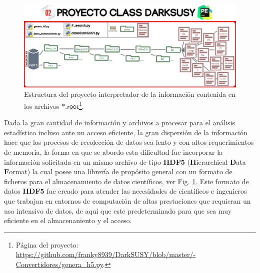 \begin{figure}[!h]
\centering
\includegraphics[width=1\textwidth]{Simulacion/imagenes/class_darksusy.png}
\caption[Estructura del proyecto interpretador de la información contenida en los archivos $\textsf{*.root}$.]{Estructura del proyecto interpretador de la información contenida en los archivos $\textsf{*.root}$\footnote{Página del proyecto: \href{https://github.com/franky8939/DarkSUSY/blob/master/00-Convertidores/genera_h5.py}{https://github.com/franky8939/\-Dark\-SUSY/\-blob/\-mas\-ter/-\-Con\-ver\-ti\-do\-res/\-ge\-ne\-ra\_h5.\-py}.}. }
\label{class_darksusy1}
\end{figure}
Dada la gran cantidad de información y archivos a procesar para el análisis estadístico incluso ante un acceso eficiente, la gran dispersión de la información hace que los procesos de recolección de datos sea lento y con altos requerimientos de memoria, la forma en que se abordo esta dificultad fue incorporar la información solicitada en un mismo archivo de tipo \textbf{HDF5} (\textbf{H}ierarchical \textbf{D}ata \textbf{F}ormat) la cual posee una librería de propósito general con un formato de ficheros para el almacenamiento de datos científicos, ver Fig. \ref{class_darksusy1}. 
Este formato de datos \textbf{HDF5} fue creado para atender las necesidades de científicos e ingenieros que trabajan en entornos de computación de altas prestaciones que requieran un uso intensivo de datos, de aquí que este predeterminado para que sea muy eficiente en el almacenaniento y el acceso. 

